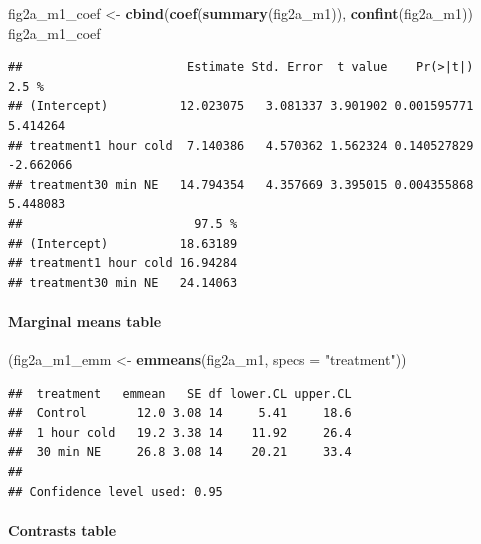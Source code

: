 \documentclass[]{book}
\newenvironment{Shaded}{\begin{snugshade}}{\end{snugshade}}
\newcommand{\DataTypeTok}[1]{\textcolor[rgb]{0.13,0.29,0.53}{#1}}
\newcommand{\KeywordTok}[1]{\textcolor[rgb]{0.13,0.29,0.53}{\textbf{#1}}}
\newcommand{\NormalTok}[1]{#1}
\newcommand{\OperatorTok}[1]{\textcolor[rgb]{0.81,0.36,0.00}{\textbf{#1}}}
\newcommand{\OtherTok}[1]{\textcolor[rgb]{0.56,0.35,0.01}{#1}}
\newcommand{\StringTok}[1]{\textcolor[rgb]{0.31,0.60,0.02}{#1}}
\let\oldparagraph\paragraph
\renewcommand{\paragraph}[1]{\oldparagraph{#1}\mbox{}}
\begin{document}
\begin{Shaded}
\begin{Highlighting}[]
\NormalTok{fig2a_m1_coef <-}\StringTok{ }\KeywordTok{cbind}\NormalTok{(}\KeywordTok{coef}\NormalTok{(}\KeywordTok{summary}\NormalTok{(fig2a_m1)),}
                        \KeywordTok{confint}\NormalTok{(fig2a_m1))}
\NormalTok{fig2a_m1_coef}
\end{Highlighting}
\end{Shaded}

\begin{verbatim}
##                       Estimate Std. Error  t value    Pr(>|t|)     2.5 %
## (Intercept)          12.023075   3.081337 3.901902 0.001595771  5.414264
## treatment1 hour cold  7.140386   4.570362 1.562324 0.140527829 -2.662066
## treatment30 min NE   14.794354   4.357669 3.395015 0.004355868  5.448083
##                        97.5 %
## (Intercept)          18.63189
## treatment1 hour cold 16.94284
## treatment30 min NE   24.14063
\end{verbatim}

\hypertarget{marginal-means-table-1}{%
\paragraph{Marginal means table}\label{marginal-means-table-1}}

\begin{Shaded}
\begin{Highlighting}[]
\NormalTok{(fig2a_m1_emm <-}\StringTok{ }\KeywordTok{emmeans}\NormalTok{(fig2a_m1, }\DataTypeTok{specs =} \StringTok{"treatment"}\NormalTok{))}
\end{Highlighting}
\end{Shaded}

\begin{verbatim}
##  treatment   emmean   SE df lower.CL upper.CL
##  Control       12.0 3.08 14     5.41     18.6
##  1 hour cold   19.2 3.38 14    11.92     26.4
##  30 min NE     26.8 3.08 14    20.21     33.4
## 
## Confidence level used: 0.95
\end{verbatim}

\hypertarget{contrasts-table-1}{%
\paragraph{Contrasts table}\label{contrasts-table-1}}

\begin{Shaded}
\end{Shaded}
\end{document}
